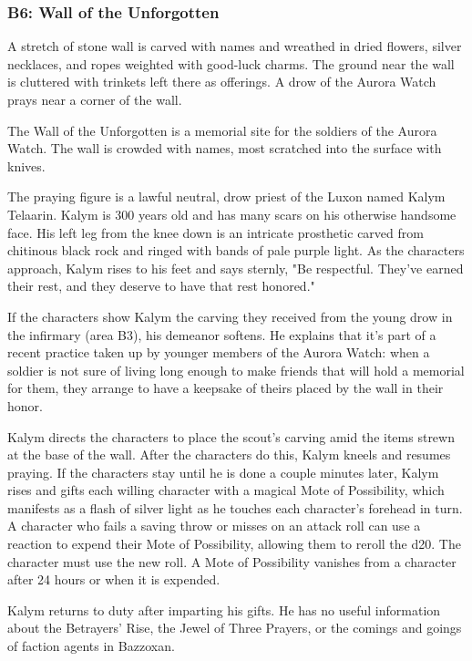 \documentclass[10pt,a4paper,twoside,bg=print,twocolumn,openany,nodeprecatedcode]{dndbook}
\begin{document}
\subsubsection{B6: Wall of the Unforgotten}
\begin{DndReadAloud}{}
A stretch of stone wall is carved with names and wreathed in dried flowers, silver necklaces, and ropes weighted with good-luck charms. The ground near the wall is cluttered with trinkets left there as offerings. A drow of the Aurora Watch prays near a corner of the wall.

\end{DndReadAloud}

The Wall of the Unforgotten is a memorial site for the soldiers of the Aurora Watch. The wall is crowded with names, most scratched into the surface with knives.

The praying figure is a lawful neutral, drow priest of the Luxon named Kalym Telaarin. Kalym is 300 years old and has many scars on his otherwise handsome face. His left leg from the knee down is an intricate prosthetic carved from chitinous black rock and ringed with bands of pale purple light. As the characters approach, Kalym rises to his feet and says sternly, "Be respectful. They've earned their rest, and they deserve to have that rest honored."

If the characters show Kalym the carving they received from the young drow in the infirmary (area B3), his demeanor softens. He explains that it's part of a recent practice taken up by younger members of the Aurora Watch: when a soldier is not sure of living long enough to make friends that will hold a memorial for them, they arrange to have a keepsake of theirs placed by the wall in their honor.

Kalym directs the characters to place the scout's carving amid the items strewn at the base of the wall. After the characters do this, Kalym kneels and resumes praying. If the characters stay until he is done a couple minutes later, Kalym rises and gifts each willing character with a magical Mote of Possibility, which manifests as a flash of silver light as he touches each character's forehead in turn. A character who fails a saving throw or misses on an attack roll can use a reaction to expend their Mote of Possibility, allowing them to reroll the d20. The character must use the new roll. A Mote of Possibility vanishes from a character after 24 hours or when it is expended.

Kalym returns to duty after imparting his gifts. He has no useful information about the Betrayers' Rise, the Jewel of Three Prayers, or the comings and goings of faction agents in Bazzoxan.
\end{document}
